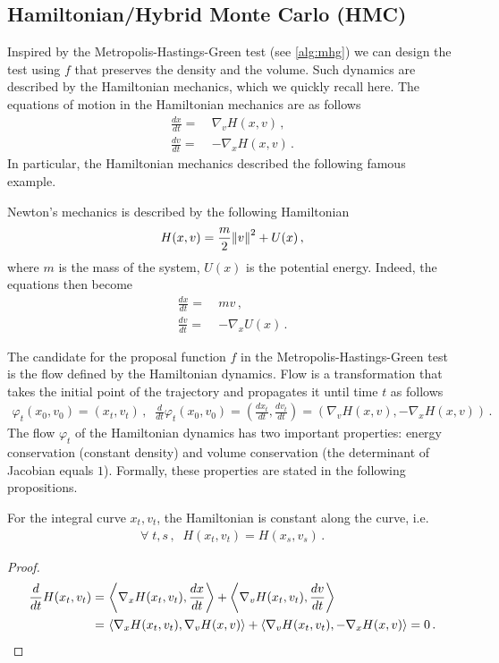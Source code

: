 \subsection{Hamiltonian/Hybrid Monte Carlo (HMC) \citep{duane1987hybrid}}

Inspired by the Metropolis-Hastings-Green test (see \cref{alg:mhg}) we can design the test using $f$ that preserves the density and the volume. Such dynamics are described by the Hamiltonian mechanics, which we quickly recall here. The equations of motion in the Hamiltonian mechanics are as follows
\begin{align}
    \frac{dx}{dt} =~& \nabla_v H(x,v)\,,\\
    \frac{dv}{dt} =~& -\nabla_x H(x,v)\,.
\end{align}
In particular, the Hamiltonian mechanics described the following famous example.
\begin{example}
    Newton's mechanics is described by the following Hamiltonian
    \begin{align}
        H(x,v) = \frac{m}{2}\norm{v}^2 + U(x)\,,
    \end{align}
    where $m$ is the mass of the system, $U(x)$ is the potential energy. Indeed, the equations then become
    \begin{align}
        \frac{dx}{dt} =~& mv\,,\\
        \frac{dv}{dt} =~& -\nabla_x U(x)\,.
    \end{align}
\end{example}

The candidate for the proposal function $f$ in the Metropolis-Hastings-Green test is the flow defined by the Hamiltonian dynamics. Flow is a transformation that takes the initial point of the trajectory and propagates it until time $t$ as follows
\begin{align}
    \varphi_t(x_0,v_0) = (x_t,v_t)\,, \;\; \frac{d}{dt}\varphi_t(x_0,v_0) = \left(\frac{dx_t}{dt},\frac{dv_t}{dt}\right) = (\nabla_v H(x,v),-\nabla_x H(x,v))\,.
\end{align}
The flow $\varphi_t$ of the Hamiltonian dynamics has two important properties: energy conservation (constant density) and volume conservation (the determinant of Jacobian equals $1$). Formally, these properties are stated in the following propositions.

\begin{proposition}
    For the integral curve $x_t, v_t$, the Hamiltonian is constant along the curve, i.e.
    \begin{align}
        \forall\; t,s\,,\;\;H(x_t,v_t) = H(x_s,v_s)\,.
    \end{align}
\end{proposition}
\begin{proof}
    \begin{align}
        \frac{d}{dt}H(x_t,v_t) =~& \inner{\nabla_x H(x_t,v_t)}{\frac{dx}{dt}} + \inner{\nabla_v H(x_t,v_t)}{\frac{dv}{dt}} \\
        =~& \inner{\nabla_x H(x_t,v_t)}{\nabla_v H(x,v)} + \inner{\nabla_v H(x_t,v_t)}{-\nabla_x H(x,v)} = 0\,.
    \end{align}
\end{proof}

